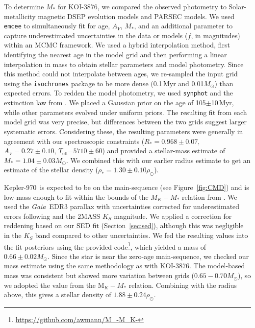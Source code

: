 \documentclass[twocolumn, linenumbers]{aastex631}
\newcommand{\starname}{KOI-3876}
\newcommand{\starnametwo}{Kepler-970}
\newcommand{\teff}{\ensuremath{T_{\text{eff}}}}
\newcommand{\gaia}{\textit{Gaia}}
\begin{document}
To determine $M_*$ for \starname, we compared the observed photometry to Solar-metallicity magnetic DSEP evolution models and PARSEC models. We used \texttt{emcee} to simultaneously fit for age, $A_V$, $M_*$, and an additional parameter to capture underestimated uncertainties in the data or models ($f$, in magnitudes) within an MCMC framework. We used a hybrid interpolation method, first identifying the nearest age in the model grid and then performing a linear interpolation in mass to obtain stellar parameters and model photometry. Since this method could not interpolate between ages, we re-sampled the input grid using the \texttt{isochrones} package \citep{2015ascl.soft03010M} to be more dense (0.1\,Myr and 0.01$M_\odot$) than expected errors. To redden the model photometry, we used \texttt{synphot} \citep{pey_lian_lim_2020_3971036} and the extinction law from \citet{1989ApJ...345..245C}. We placed a Gaussian prior on the age of 105$\pm$10\,Myr, while other parameters evolved under uniform priors. The resulting fit from each model grid was very precise, but differences between the two grids suggest larger systematic errors. Considering these, the resulting parameters were generally in agreement with our spectroscopic constraints ($R_*=0.968\pm0.07$, $A_V=0.27\pm0.10$, \teff=$5710\pm60$) and provided a stellar-mass estimate of $M_*=1.04\pm0.03M_\odot$. We combined this with our earlier radius estimate to get an estimate of the stellar density ($\rho_*=1.30\pm0.10\rho_\odot$).

\starnametwo\ is expected to be on the main-sequence (see Figure~\ref{fig:CMD}) and is low-mass enough to fit within the bounds of the $M_K-M_*$ relation from \citet{Mann2019a}. We used the \gaia\ EDR3 parallax with uncertainties corrected for underestimated errors following \citet{2021MNRAS.506.2269E} and the 2MASS $K_S$ magnitude. We applied a correction for reddening based on our SED fit (Section~\ref{sec:sed}), although this was negligible in the $K_S$ band compared to other uncertainties. We fed the resulting values into the fit posteriors using the provided code\footnote{\url{https://github.com/awmann/M_-M_K-}}, which yielded a mass of $0.66\pm0.02M_\odot$. Since the star is near the zero-age main-sequence, we checked our mass estimate using the same methodology as with \starname. The model-based mass was consistent but showed more variation between grids ($0.65-0.70M_\odot$), so we adopted the value from the M$_K-M_*$ relation. Combining with the radius above, this gives a stellar density of $1.88\pm0.24\rho_\odot$.
\end{document}
